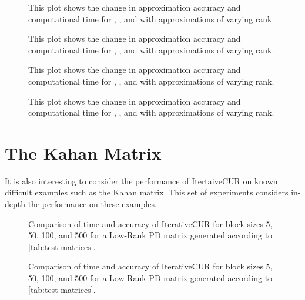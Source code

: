 \begin{figure}[H]
    \centering
    
    \caption{This plot shows the change in approximation accuracy and computational time for \svds, \icurl, and \curs with approximations of varying rank.}
    \label{fig:fixed_rank_bcircuit}
\end{figure}

\begin{figure}[H]
    \centering
    
    \caption{This plot shows the change in approximation accuracy and computational time for \svds, \icurl, and \curs with approximations of varying rank.}
    \label{fig:fixed_rank_randlow}
\end{figure}
\begin{figure}[H]
    \centering
    
     \caption{This plot shows the change in approximation accuracy and computational time for \svds, \icurl, and \curs with approximations of varying rank.}
    \label{fig:fixed_rank_randsvd}
\end{figure}
\begin{figure}[H]
    \centering
    
    \caption{This plot shows the change in approximation accuracy and computational time for \svds, \icurl, and \curs with approximations of varying rank.}
    \label{fig:fixed_rank_venkat}
\end{figure}

\section{The Kahan Matrix}
It is also interesting to consider the performance of ItertaiveCUR on known difficult examples such as the Kahan matrix. This set of experiments considers in-depth the performance on these examples.

\begin{figure}
    \centering
    
    \caption{Comparison of time and accuracy of IterativeCUR for block sizes 5, 50, 100, and 500 for a Low-Rank PD matrix generated according to \cref{tab:test-matrices}.}
    \label{fig:kahan-acc}
\end{figure}
\begin{figure}
    \centering
    
    \caption{Comparison of time and accuracy of IterativeCUR for block sizes 5, 50, 100, and 500 for a Low-Rank PD matrix generated according to \cref{tab:test-matrices}.}
    \label{fig:kahan-var-acc}
\end{figure}